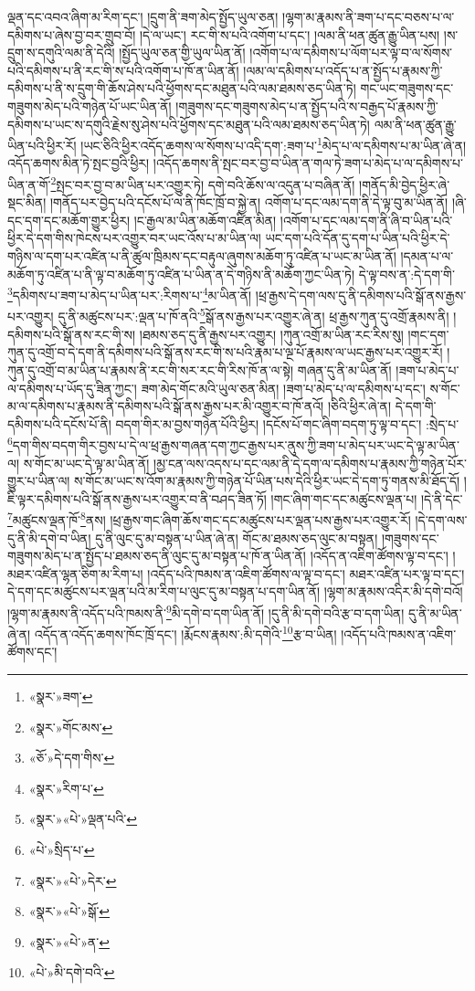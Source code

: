 ལྡན་དང་འབའ་ཞིག་མ་རིག་དང་། །དྲུག་ནི་ཟག་མེད་སྤྱོད་ཡུལ་ཅན། །ལྷག་མ་རྣམས་ནི་ཟག་པ་དང་བཅས་པ་ལ་དམིགས་པ་ཞེས་བྱ་བར་གྲུབ་བོ། །དེ་ལ་ཡང་། རང་གི་ས་པའི་འགོག་པ་དང་། །ལམ་ནི་ཕན་ཚུན་རྒྱུ་ཡིན་པས། །ས་དྲུག་ས་དགུའི་ལམ་ནི་དེའི། །སྤྱོད་ཡུལ་ཅན་གྱི་ཡུལ་ཡིན་ནོ། །འགོག་པ་ལ་དམིགས་པ་ལོག་པར་ལྟ་བ་ལ་སོགས་པའི་དམིགས་པ་ནི་རང་གི་ས་པའི་འགོག་པ་ཁོ་ན་ཡིན་ནོ། །ལམ་ལ་དམིགས་པ་འདོད་པ་ན་སྤྱོད་པ་རྣམས་ཀྱི་དམིགས་པ་ནི་ས་དྲུག་གི་ཆོས་ཤེས་པའི་ཕྱོགས་དང་མཐུན་པའི་ལམ་ཐམས་ཅད་ཡིན་ཏེ། གང་ཡང་གཟུགས་དང་གཟུགས་མེད་པའི་གཉེན་པོ་ཡང་ཡིན་ནོ། །གཟུགས་དང་གཟུགས་མེད་པ་ན་སྤྱོད་པའི་ས་བརྒྱད་པོ་རྣམས་ཀྱི་དམིགས་པ་ཡང་ས་དགུའི་རྗེས་སུ་ཤེས་པའི་ཕྱོགས་དང་མཐུན་པའི་ལམ་ཐམས་ཅད་ཡིན་ཏེ། ལམ་ནི་ཕན་ཚུན་རྒྱུ་ཡིན་པའི་ཕྱིར་རོ། །ཡང་ཅིའི་ཕྱིར་འདོད་ཆགས་ལ་སོགས་པ་འདི་དག་:ཟག་པ་\footnote{«སྣར་»ཟག་}མེད་པ་ལ་དམིགས་པ་མ་ཡིན་ཞེ་ན། འདོད་ཆགས་མིན་ཏེ་སྤང་བྱའི་ཕྱིར། །འདོད་ཆགས་ནི་སྤང་བར་བྱ་བ་ཡིན་ན་གལ་ཏེ་ཟག་པ་མེད་པ་ལ་དམིགས་པ་ཡིན་ན་གོ་\footnote{«སྣར་»གོང་མས་}སྤང་བར་བྱ་བ་མ་ཡིན་པར་འགྱུར་ཏེ། དགེ་བའི་ཆོས་ལ་འདུན་པ་བཞིན་ནོ། །གནོད་མི་བྱེད་ཕྱིར་ཞེ་སྡང་མིན། །གནོད་པར་བྱེད་པའི་དངོས་པོ་ལ་ནི་ཁོང་ཁྲོ་བ་སྐྱེ་ན། འགོག་པ་དང་ལམ་དག་ནི་དེ་ལྟ་བུ་མ་ཡིན་ནོ། །ཞི་དང་དག་དང་མཆོག་གྱུར་ཕྱིར། །ང་རྒྱལ་མ་ཡིན་མཆོག་འཛིན་མིན། །འགོག་པ་དང་ལམ་དག་ནི་ཞི་བ་ཡིན་པའི་ཕྱིར་དེ་དག་གིས་ཁེངས་པར་འགྱུར་བར་ཡང་འོས་པ་མ་ཡིན་ལ། ཡང་དག་པའི་དོན་དུ་དག་པ་ཡིན་པའི་ཕྱིར་དེ་གཉིས་ལ་དག་པར་འཛིན་པ་ནི་ཚུལ་ཁྲིམས་དང་བརྟུལ་ཞུགས་མཆོག་ཏུ་འཛིན་པ་ཡང་མ་ཡིན་ནོ། །དམན་པ་ལ་མཆོག་ཏུ་འཛིན་པ་ནི་ལྟ་བ་མཆོག་ཏུ་འཛིན་པ་ཡིན་ན་དེ་གཉིས་ནི་མཆོག་ཀྱང་ཡིན་ཏེ། དེ་ལྟ་བས་ན་:དེ་དག་གི་\footnote{«ཅོ་»དེ་དག་གིས་}དམིགས་པ་ཟག་པ་མེད་པ་ཡིན་པར་:རིགས་པ་\footnote{«སྣར་»རིག་པ་}མ་ཡིན་ནོ། །ཕྲ་རྒྱས་དེ་དག་ལས་དུ་ནི་དམིགས་པའི་སྒོ་ནས་རྒྱས་པར་འགྱུར། དུ་ནི་མཚུངས་པར་:ལྡན་པ་ཁོ་ནའི་\footnote{«སྣར་»«པེ་»ལྡན་པའི་}སྒོ་ནས་རྒྱས་པར་འགྱུར་ཞེ་ན། ཕྲ་རྒྱས་ཀུན་དུ་འགྲོ་རྣམས་ནི། །དམིགས་པའི་སྒོ་ནས་རང་གི་ས། །ཐམས་ཅད་དུ་ནི་རྒྱས་པར་འགྱུར། །ཀུན་འགྲོ་མ་ཡིན་རང་རིས་སུ། །གང་དག་ཀུན་དུ་འགྲོ་བ་དེ་དག་ནི་དམིགས་པའི་སྒོ་ནས་རང་གི་ས་པའི་རྣམ་པ་ལྔ་པོ་རྣམས་ལ་ཡང་རྒྱས་པར་འགྱུར་རོ། །ཀུན་དུ་འགྲོ་བ་མ་ཡིན་པ་རྣམས་ནི་རང་གི་སར་རང་གི་རིས་ཁོ་ན་ལ་སྟེ། གཞན་དུ་ནི་མ་ཡིན་ནོ། །ཟག་པ་མེད་པ་ལ་དམིགས་པ་ཡོད་དུ་ཟིན་ཀྱང་། ཟག་མེད་གོང་མའི་ཡུལ་ཅན་མིན། །ཟག་པ་མེད་པ་ལ་དམིགས་པ་དང་། ས་གོང་མ་ལ་དམིགས་པ་རྣམས་ནི་དམིགས་པའི་སྒོ་ནས་རྒྱས་པར་མི་འགྱུར་བ་ཁོ་ནའོ། །ཅིའི་ཕྱིར་ཞེ་ན། དེ་དག་གི་དམིགས་པའི་དངོས་པོ་ནི། བདག་གིར་མ་བྱས་གཉེན་པོའི་ཕྱིར། །དངོས་པོ་གང་ཞིག་བདག་ཏུ་ལྟ་བ་དང་། :སྲེད་པ་\footnote{«པེ་»སྲིད་པ་}དག་གིས་བདག་གིར་བྱས་པ་དེ་ལ་ཕྲ་རྒྱས་གཞན་དག་ཀྱང་རྒྱས་པར་ནུས་ཀྱི་ཟག་པ་མེད་པར་ཡང་དེ་ལྟ་མ་ཡིན་ལ། ས་གོང་མ་ཡང་དེ་ལྟ་མ་ཡིན་ནོ། །མྱ་ངན་ལས་འདས་པ་དང་ལམ་ནི་དེ་དག་ལ་དམིགས་པ་རྣམས་ཀྱི་གཉེན་པོར་གྱུར་པ་ཡིན་ལ། ས་གོང་མ་ཡང་ས་འོག་མ་རྣམས་ཀྱི་གཉེན་པོ་ཡིན་པས་དེའི་ཕྱིར་ཡང་དེ་དག་ཏུ་གནས་མི་ཐོད་དོ། །ཇི་ལྟར་དམིགས་པའི་སྒོ་ནས་རྒྱས་པར་འགྱུར་བ་ནི་བཤད་ཟིན་ཏོ། །གང་ཞིག་གང་དང་མཚུངས་ལྡན་པ། །དེ་ནི་དེང་\footnote{«སྣར་»«པེ་»དེར་}མཚུངས་ལྡན་ཁོ་\footnote{«སྣར་»«པེ་»སྒོ་}ནས། །ཕྲ་རྒྱས་གང་ཞིག་ཆོས་གང་དང་མཚུངས་པར་ལྡན་པས་རྒྱས་པར་འགྱུར་རོ། །དེ་དག་ལས་དུ་ནི་མི་དགེ་བ་ཡིན། དུ་ནི་ལུང་དུ་མ་བསྟན་པ་ཡིན་ཞེ་ན། གོང་མ་ཐམས་ཅད་ལུང་མ་བསྟན། །གཟུགས་དང་གཟུགས་མེད་པ་ན་སྤྱོད་པ་ཐམས་ཅད་ནི་ལུང་དུ་མ་བསྟན་པ་ཁོ་ན་ཡིན་ནོ། །འདོད་ན་འཇིག་ཚོགས་ལྟ་བ་དང་། །མཐར་འཛིན་ལྷན་ཅིག་མ་རིག་པ། །འདོད་པའི་ཁམས་ན་འཇིག་ཚོགས་ལ་ལྟ་བ་དང་། མཐར་འཛིན་པར་ལྟ་བ་དང་། དེ་དག་དང་མཚུངས་པར་ལྡན་པའི་མ་རིག་པ་ལུང་དུ་མ་བསྟན་པ་དག་ཡིན་ནོ། །ལྷག་མ་རྣམས་འདིར་མི་དགེ་བའོ། །ལྷག་མ་རྣམས་ནི་འདོད་པའི་ཁམས་ནི་\footnote{«སྣར་»«པེ་»ན་}མི་དགེ་བ་དག་ཡིན་ནོ། །དུ་ནི་མི་དགེ་བའི་རྩ་བ་དག་ཡིན། དུ་ནི་མ་ཡིན་ཞེ་ན། འདོད་ན་འདོད་ཆགས་ཁོང་ཁྲོ་དང་། །རྨོངས་རྣམས་:མི་དགེའི་\footnote{«པེ་»མི་དགེ་བའི་}རྩ་བ་ཡིན། །འདོད་པའི་ཁམས་ན་འཇིག་ཚོགས་དང་། 